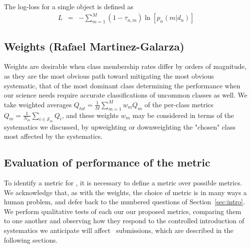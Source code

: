 The log-loss for a single object is defined as
\begin{eqnarray}
L &=& -\sum_{m=1}^{M}(1-\tau_{n, m})\ln[p_{n}(m | d_{n})]
\end{eqnarray}

%

\subsection{Weights (Rafael Martinez-Galarza)}
\label{sec:weights}


Weights are desirable when class membership rates differ by orders of magnitude, as they are the most obvious path toward mitigating the most obvious systematic, that of the most dominant class determining the performance when our science needs require accurate classifications of uncommon classes as well.
We take weighted averages $Q_{tot} = \frac{1}{M}\sum_{m=1}^{M}w_{m}Q_{m}$ of the per-class metrics $Q_{m} = \frac{1}{N_{m}}\sum_{i\in\mathcal{S}_{m}}Q_{i}$, and these weights $w_{m}$ may be considered in terms of the systematics we discussed, by upweighting or downweighting the "chosen" class most affected by the systematics.

\subsection{Evaluation of performance of the metric}
\label{sec:inception}

To identify a metric for \plasticc, it is necessary to define a metric over possible metrics.
We acknowledge that, as with the weights, the choice of metric is in many ways a human problem, and defer back to the numbered questions of Section~\ref{sec:intro}.
We perform qualitative tests of each our our proposed metrics, comparing them to one another and observing how they respond to the controlled introduction of systematics we anticipate will affect \plasticc\ submissions, which are described in the following sections.
